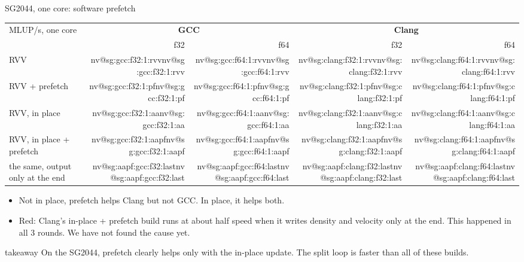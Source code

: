 \documentclass[aspectratio=169,10pt,t]{beamer}
\makeatletter
\newcommand{\nv}[1]{\ifcsname nv@#1\endcsname\csname nv@#1\endcsname\else
  \errmessage{presentation7: unknown number '#1' (see tables/numbers.tex)}\fi}
\newcommand{\takeaway}[1]{\par\vfill
  \begin{beamercolorbox}[wd=\textwidth,sep=4pt,rounded=true]{takeaway}
    \small #1
  \end{beamercolorbox}}
\makeatother
\begin{document}
\begin{frame}{SG2044, one core: software prefetch}
  \vspace{1mm}
  \centering
  {\footnotesize\renewcommand{\arraystretch}{1.12}
  \begin{tabular}{@{}lrrrr@{}}
    \toprule
    MLUP/s, one core & \multicolumn{2}{c}{\textbf{GCC}} & \multicolumn{2}{c}{\textbf{Clang}}\\
    \cmidrule(lr){2-3}\cmidrule(l){4-5}
    & f32 & f64 & f32 & f64\\
    \midrule
    RVV & \nv{sg:gcc:f32:1:rvv} & \nv{sg:gcc:f64:1:rvv} & \nv{sg:clang:f32:1:rvv} & \nv{sg:clang:f64:1:rvv}\\
    RVV + prefetch & \nv{sg:gcc:f32:1:pf} & \nv{sg:gcc:f64:1:pf} & \nv{sg:clang:f32:1:pf} & \nv{sg:clang:f64:1:pf}\\
    \midrule
    RVV, in place & \nv{sg:gcc:f32:1:aa} & \nv{sg:gcc:f64:1:aa} & \nv{sg:clang:f32:1:aa} & \nv{sg:clang:f64:1:aa}\\
    RVV, in place + prefetch & \nv{sg:gcc:f32:1:aapf} & \nv{sg:gcc:f64:1:aapf} & \nv{sg:clang:f32:1:aapf} & \nv{sg:clang:f64:1:aapf}\\
    \hspace{1em}the same, output only at the end & \nv{sg:aapf:gcc:f32:last} & \nv{sg:aapf:gcc:f64:last}
      & \textcolor{psred}{\nv{sg:aapf:clang:f32:last}} & \textcolor{psred}{\nv{sg:aapf:clang:f64:last}}\\
    \bottomrule
  \end{tabular}\par}
  \vspace{2mm}
  \raggedright
  \begin{itemize}\small
    \item Not in place, prefetch helps Clang but not GCC. In place, it helps both.
    \item \textcolor{psred}{Red}: Clang's in-place + prefetch build runs at about half speed when it writes density
          and velocity only at the end. This happened in all 3 rounds. We have not found the cause yet.
  \end{itemize}
  \takeaway{On the SG2044, prefetch clearly helps only with the in-place update. The split loop is faster than all
    of these builds.}
\end{frame}
\end{document}

